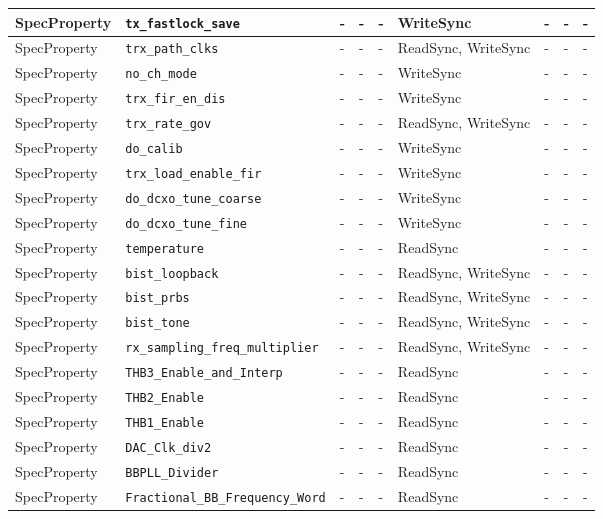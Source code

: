 \documentclass{article}
\begin{document}
\begin{landscape}
\begin{scriptsize}
\begin{longtable}{|p{2cm}|p{4cm}|p{1cm}|p{2cm}|p{2cm}|p{2cm}|p{2cm}|p{1cm}|p{4.58cm}|}
			\hline
			SpecProperty & \verb+tx_fastlock_save+ & - & - & - & WriteSync & - & - & - \\
			\hline
			SpecProperty & \verb+trx_path_clks+ & - & - & - & ReadSync, WriteSync & - & - & - \\
			\hline
			SpecProperty & \verb+no_ch_mode+ & - & - & - & WriteSync & - & - & - \\
			\hline
			SpecProperty & \verb+trx_fir_en_dis+ & - & - & - & WriteSync & - & - & - \\
			\hline
			SpecProperty & \verb+trx_rate_gov+ & - & - & - & ReadSync, WriteSync & - & - & - \\
			\hline
			SpecProperty & \verb+do_calib+ & - & - & - & WriteSync & - & - & - \\
			\hline
			SpecProperty & \verb+trx_load_enable_fir+ & - & - & - & WriteSync & - & - & - \\
			\hline
			SpecProperty & \verb+do_dcxo_tune_coarse+ & - & - & - & WriteSync & - & - & - \\
			\hline
			SpecProperty & \verb+do_dcxo_tune_fine+ & - & - & - & WriteSync & - & - & - \\
			\hline
			SpecProperty & \verb+temperature+ & - & - & - & ReadSync & - & - & - \\
			\hline
			SpecProperty & \verb+bist_loopback+ & - & - & - & ReadSync, WriteSync & - & - & - \\
			\hline
			SpecProperty & \verb+bist_prbs+ & - & - & - & ReadSync, WriteSync & - & - & - \\
			\hline
			SpecProperty & \verb+bist_tone+ & - & - & - & ReadSync, WriteSync & - & - & - \\
			\hline
			SpecProperty & \verb+rx_sampling_freq_multiplier+ & - & - & - & ReadSync, WriteSync & - & - & - \\
			\hline
			SpecProperty & \verb+THB3_Enable_and_Interp+ & - & - & - & ReadSync & - & - & - \\
			\hline
			SpecProperty & \verb+THB2_Enable+ & - & - & - & ReadSync & - & - & - \\
			\hline
			SpecProperty & \verb+THB1_Enable+ & - & - & - & ReadSync & - & - & - \\
			\hline
			SpecProperty & \verb+DAC_Clk_div2+ & - & - & - & ReadSync & - & - & - \\
			\hline
			SpecProperty & \verb+BBPLL_Divider+ & - & - & - & ReadSync & - & - & - \\
			\hline
			SpecProperty & \verb+Fractional_BB_Frequency_Word+ & - & - & - & ReadSync & - & - & - \\

\end{longtable}
\end{scriptsize}
\end{landscape}
\end{document}
